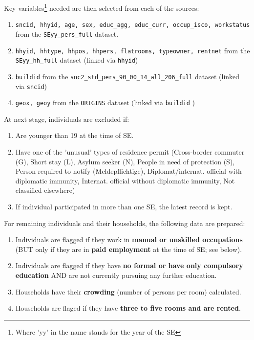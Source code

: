 \documentclass[a4paper, notitlepage, fleqn]{article} %
\begin{document}
Key variables\footnote{Where 'yy' in the name stands for the year of the SE} needed are then selected from each of the sources:
	
\begin{enumerate}

	\item \texttt{sncid, hhyid, age, sex, educ\_agg, educ\_curr, occup\_isco, workstatus} from the 
		\texttt{SEyy\_pers\_full} dataset.
		
	\item \texttt{hhyid, hhtype, hhpos, hhpers, flatrooms, typeowner, rentnet}
		from the \texttt{SEyy\_hh\_full} dataset (linked via \texttt{hhyid}) 
	
	\item \texttt{buildid}
		from the \texttt{snc2\_std\_pers\_90\_00\_14\_all\_206\_full} dataset 
		(linked via \texttt{sncid})
	
	\item \texttt{geox, geoy}
		from the \texttt{ORIGINS} dataset (linked via \texttt{buildid} 	)

\end{enumerate}

At next stage, individuals are excluded if:

\begin{enumerate}
	
	\item Are younger than 19 at the time of SE.
	
	\item Have one of the 'unusual' types of residence permit 
	(Cross-border commuter (G), Short stay (L), Asylum seeker (N), People in need of protection (S), 
	Person required to notify (Meldepflichtige), 
	Diplomat/internat. official with diplomatic immunity, 
	Internat. official without diplomatic immunity, 
	Not classified elsewhere)	
	
	\item If individual participated in more than one SE, the latest record is kept.

\end{enumerate}

For remaining individuals and their households, the following data are prepared:

\begin{enumerate}
	
	\item Individuals are flagged if they work in \textbf{manual or unskilled occupations} 
		(BUT only if they are in \textbf{paid employment} at the time of SE; see below).
	\item Individuals are flagged if they have \textbf{no formal or have only compulsory education} 
		AND are not currently pursuing any further education.
	\item Households have their \textbf{crowding} (number of persons per room) calculated.
	\item Households are flaged if they have \textbf{three to five rooms and are rented}.
	
\end{enumerate}
\end{document}
